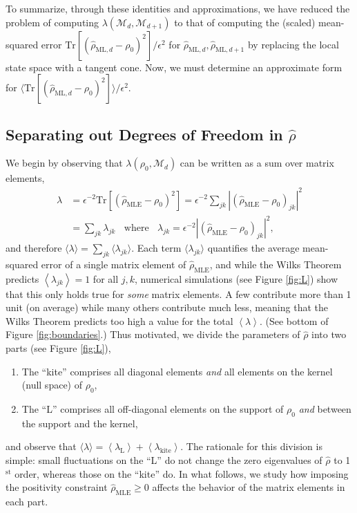 \documentclass[aps,pra, twocolumn]{revtex4-1}
\newcommand{\M}{\mathcal{M}}
\newcommand{\expect}[1]{\ensuremath{\left\langle#1\right\rangle}}
\newcommand{\rhohat}{\hat{\rho}}
\newcommand{\rhoMLE}{\rhohat_{\scriptscriptstyle\mathrm{MLE}}}
\newcommand{\rhoML}[1]{\rhohat_{\scriptscriptstyle{\mathrm{ML},#1}}}
\begin{document}
To summarize, through these identities and approximations, we have reduced the problem of computing $\lambda(\M_{d}, \M_{d+1})$ to that of computing the (scaled) mean-squared error $\mathrm{Tr}[(\rhoML{d} - \rho_{0})^{2}]/\epsilon^{2}$ for $\rhoML{d}, \rhoML{d+1}$ by replacing the local state space with a tangent cone.
Now, we must determine an approximate form for $\langle\mathrm{Tr}[(\rhoML{d} - \rho_{0})^{2}]\rangle/\epsilon^{2}$.

\subsection{Separating out Degrees of Freedom in $\rhohat$}

We begin by observing that $\lambda(\rho_{0}, \M_{d})$ can be written as a sum over matrix elements,
\begin{align}
\label{eq:llrserrors}
\nonumber \lambda &=\epsilon^{-2}\mathrm{Tr}[(\rhoMLE - \rho_{0})^{2}] = \epsilon^{-2}\sum_{jk}|(\rhoMLE- \rho_{0} )_{jk}|^{2}\\
&= \sum_{jk}\lambda_{jk}~~~~\text{where}~~~~\lambda_{jk} = \epsilon^{-2}|(\rhoMLE - \rho_{0} )_{jk} |^{2},
\end{align}
and therefore $\langle \lambda \rangle = \sum_{jk}\langle\lambda_{jk}\rangle$.  Each term $\langle \lambda_{jk}\rangle$ quantifies the average mean-squared error of a single matrix element of $\rhoMLE$, and while the Wilks Theorem predicts $\expect{\lambda_{jk}}=1$ for all $j,k$, numerical simulations (see Figure \ref{fig:L}) show that this only holds true for \emph{some} matrix elements.  A few contribute more than 1 unit (on average) while many others contribute much less, meaning that the Wilks Theorem predicts too high a value for the total $\expect{\lambda}$.  (See bottom of Figure \ref{fig:boundaries}.) Thus motivated, we divide the parameters of $\rhohat$ into two parts (see Figure \ref{fig:L}),
\begin{enumerate}[noitemsep]
\item The ``kite'' comprises all diagonal elements \emph{and} all elements on the kernel (null space) of $\rho_0$,
\item The ``L'' comprises all off-diagonal elements on the support of $\rho_0$ \emph{and} between the support and the kernel,
\end{enumerate}
and observe that $\langle\lambda\rangle = \expect{\lambda_{\mathrm{L}}} + \expect{\lambda_{\mathrm{kite}}}$.  The rationale for this division is simple:  small fluctuations on the ``L'' do not change the zero eigenvalues of $\hat\rho$ to 1$^{\mathrm{st}}$ order, whereas those on the ``kite'' do. In what follows, we study how imposing the positivity constraint $\rhoMLE \geq 0$ affects the behavior of the matrix elements in each part.
\end{document}
